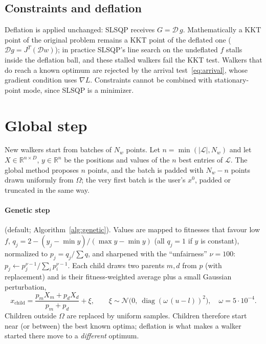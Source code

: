 \documentclass[11pt]{article}
\newcommand{\R}{\mathbb{R}}
\DeclareMathOperator{\diag}{diag}
\begin{document}
\subsection{Constraints and deflation}

Deflation is applied unchanged: SLSQP receives $G = \mathcal{D}\, g$. Mathematically a KKT point
of the original problem remains a KKT point of the deflated one ($\mathcal{D} g = J^T
(\mathcal{D} w)$); in practice SLSQP's line search on the undeflated $f$ stalls inside the
deflation ball, and these stalled walkers fail the KKT test. Walkers that do reach a known
optimum are rejected by the arrival test~\eqref{eq:arrival}, whose gradient condition uses
$\nabla L$. Constraints cannot be combined with stationary-point mode, since SLSQP is a
minimizer.

\section{Global step}\label{sec:global}

New walkers start from batches of $N_w$ points. Let $n = \min(|\mathcal{L}|, N_w)$ and let
$X \in \R^{n\times D}$, $y \in \R^n$ be the positions and values of the $n$ best entries of
$\mathcal{L}$. The global method proposes $n$ points, and the batch is padded with
$N_w - n$ points drawn uniformly from $\Omega$; the very first batch is the user's $x^0$, padded
or truncated in the same way.

\paragraph{Genetic step} (default; Algorithm~\ref{alg:genetic}). Values are mapped to
fitnesses that favour low $f$, $q_j = 2 - (y_j - \min y)/(\max y - \min y)$ (all $q_j = 1$ if
$y$ is constant), normalized to $p_j = q_j / \sum q$, and sharpened with the ``unfairness''
$\nu = 100$: $p_j \leftarrow p_j^{\nu-1} / \sum_i p_i^{\nu-1}$. Each child draws two parents
$m, d$ from $p$ (with replacement) and is their fitness-weighted average plus a small Gaussian
perturbation,
\[
  x_{\text{child}} = \frac{p_m X_m + p_d X_d}{p_m + p_d} + \xi, \qquad
  \xi \sim \mathcal{N}\big(0,\ \diag(\omega\,(u - l))^2\big), \quad \omega = 5\cdot 10^{-4}.
\]
Children outside $\Omega$ are replaced by uniform samples. Children therefore start near (or
between) the best known optima; deflation is what makes a walker started there move to a
\emph{different} optimum.
\end{document}
